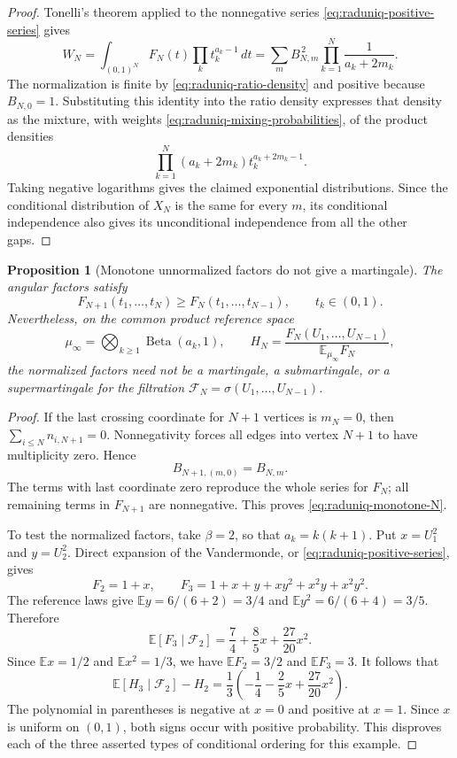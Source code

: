 \documentclass[11pt,a4paper]{article}
\numberwithin{equation}{section}
\newtheorem{proposition}[theorem]{Proposition}
\theoremstyle{definition}
\theoremstyle{remark}
\begin{document}
\begin{proof}
Tonelli's theorem applied to the nonnegative series
\eqref{eq:raduniq-positive-series} gives
\[
 W_N=\int_{(0,1)^N}F_N(t)\prod_k t_k^{a_k-1}\,dt
     =\sum_m B_{N,m}^{\,2}\prod_{k=1}^N\frac1{a_k+2m_k}.
\]
The normalization is finite by \eqref{eq:raduniq-ratio-density} and
positive because $B_{N,0}=1$. Substituting this identity into the ratio
density expresses that density as the mixture, with weights
\eqref{eq:raduniq-mixing-probabilities}, of the product densities
\[
 \prod_{k=1}^N(a_k+2m_k)t_k^{a_k+2m_k-1}.
\]
Taking negative logarithms gives the claimed exponential distributions.
Since the conditional distribution of $X_N$ is the same for every $m$,
its conditional independence also gives its unconditional independence
from all the other gaps.
\end{proof}

\begin{proposition}[Monotone unnormalized factors do not give a martingale]
\label{prop:raduniq-not-martingale}
The angular factors satisfy
\begin{equation}\label{eq:raduniq-monotone-N}
 F_{N+1}(t_1,\ldots,t_N)
 \ge F_N(t_1,\ldots,t_{N-1}),\qquad t_k\in(0,1).
\end{equation}
Nevertheless, on the common product reference space
\[
 \mu_\infty=\bigotimes_{k\ge1}\operatorname{Beta}(a_k,1),
 \qquad
 H_N=\frac{F_N(U_1,\ldots,U_{N-1})}
               {\mathbb E_{\mu_\infty}F_N},
\]
the normalized factors need not be a martingale, a submartingale, or a
supermartingale for the filtration
$\mathcal F_N=\sigma(U_1,\ldots,U_{N-1})$.
\end{proposition}

\begin{proof}
If the last crossing coordinate for $N+1$ vertices is $m_N=0$, then
$\sum_{i\le N}n_{i,N+1}=0$. Nonnegativity forces all edges into vertex
$N+1$ to have multiplicity zero. Hence
\[
 B_{N+1,(m,0)}=B_{N,m}.
\]
The terms with last coordinate zero reproduce the whole series for
$F_N$; all remaining terms in $F_{N+1}$ are nonnegative. This proves
\eqref{eq:raduniq-monotone-N}.

To test the normalized factors, take $\beta=2$, so that $a_k=k(k+1)$.
Put $x=U_1^2$ and $y=U_2^2$. Direct expansion of the Vandermonde, or
\eqref{eq:raduniq-positive-series}, gives
\[
 F_2=1+x,\qquad
 F_3=1+x+y+xy^2+x^2y+x^2y^2.
\]
The reference laws give
$\mathbb Ey=6/(6+2)=3/4$ and
$\mathbb Ey^2=6/(6+4)=3/5$. Therefore
\[
 \mathbb E[F_3\mid\mathcal F_2]
 =\frac74+\frac85x+\frac{27}{20}x^2.
\]
Since $\mathbb Ex=1/2$ and $\mathbb Ex^2=1/3$, we have
$\mathbb EF_2=3/2$ and $\mathbb EF_3=3$. It follows that
\begin{equation}\label{eq:raduniq-sign-changing}
 \mathbb E[H_3\mid\mathcal F_2]-H_2
 =\frac13\left(-\frac14-\frac25x+\frac{27}{20}x^2\right).
\end{equation}
The polynomial in parentheses is negative at $x=0$ and positive at
$x=1$. Since $x$ is uniform on $(0,1)$, both signs occur with positive
probability. This disproves each of the three asserted types of
conditional ordering for this example.
\end{proof}
\end{document}
